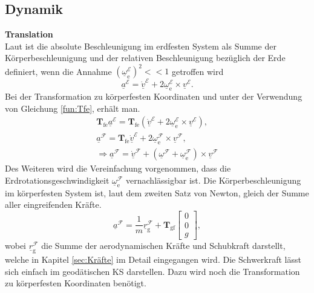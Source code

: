\subsection{Dynamik}
\textbf{Translation}\\
Laut \cite{FlugmechanikBuch} ist die absolute Beschleunigung im erdfesten System  als Summe der Körperbeschleunigung  und der relativen Beschleunigung bezüglich der Erde definiert, wenn die Annahme $(\underline{\omega}_\mathrm{e}^\mathcal{E})^2 <<1$ getroffen wird
\begin{equation}
\label{fun:a}
\underline{a}^\mathcal{E} = \underline{\dot{v}}^\mathcal{E} + 2\underline{\omega}_\mathrm{e}^\mathcal{E} \times \underline{v}^\mathcal{E}.
\end{equation}
Bei der Transformation zu körperfesten Koordinaten und unter der Verwendung von Gleichung \ref{fun:Tfe}, erhält man.
\begin{align}
\textbf{T}_\mathrm{fe}\underline{a}^\mathcal{E} = \textbf{T}_\mathrm{fe}(\underline{\dot{v}}^\mathcal{E} + 2\underline{\omega}_\mathrm{e}^\mathcal{E} \times \underline{v}^\mathcal{E}),\\
\underline{a}^\mathcal{F} = \textbf{T}_\mathrm{fe}\underline{\dot{v}}^\mathcal{E} +  2\underline{\omega}_\mathrm{e}^\mathcal{F} \times \underline{v}^\mathcal{F},\\
\label{fun:a}
\Rightarrow \underline{a}^\mathcal{F} = \underline{\dot{v}}^\mathcal{F} + (\underline{\omega}^\mathcal{F}+\underline{\omega}_\mathrm{e}^\mathcal{F})\times \underline{v}^\mathcal{F}
\end{align}
Des Weiteren wird die Vereinfachung vorgenommen, dass die Erdrotationsgeschwindigkeit $\underline{\omega}_\mathrm{e}^\mathcal{F}$ vernachlässigbar ist. Die Körperbeschleunigung im körperfesten System ist, laut dem zweiten Satz von Newton, gleich der Summe aller eingreifenden Kräfte. 
\begin{equation}
\label{fun:SummeKräfte}
\underline{a}^\mathcal{F} = \dfrac{1}{m}\underline{r}^\mathcal{F}_\mathrm{g} + \textbf{T}_\mathrm{gf}\begin{bmatrix} 
0 \\ 0 \\ g 
\end{bmatrix},
\end{equation}
wobei $\underline{r}^\mathcal{F}_\mathrm{g}$ die Summe der aerodynamischen Kräfte und Schubkraft darstellt, welche in Kapitel \ref{sec:Kräfte} im Detail eingegangen wird. Die Schwerkraft lässt sich einfach im geodätischen KS darstellen. Dazu wird noch die Transformation zu körperfesten Koordinaten benötigt.\\
